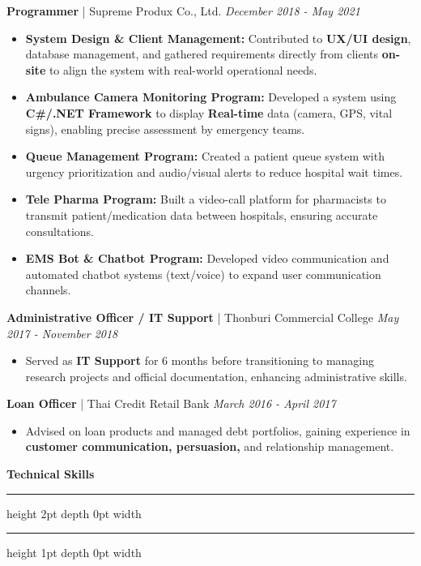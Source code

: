 \documentclass[11pt, a4paper]{article}
\newcommand{\sectiontitle}[1]{
    \vspace{1em}
    {\Large\bfseries\sffamily\color{primaryblue} #1} 
    \vspace{0.3em}
    \hrule height 2pt depth 0pt width \textwidth \color{linecolor}
    \hrule height 1pt depth 0pt width \textwidth
    \vspace{0.7em}
}
\newcommand{\jobentry}[3]{
    \vspace{0.7em} %
    \textbf{\color{black}#1} | #2 \hfill \emph{#3}
}
\begin{document}
\jobentry{Programmer}{Supreme Produx Co., Ltd.}{December 2018 - May 2021}
\begin{itemize}
    \item \textbf{System Design \& Client Management:} Contributed to \textbf{UX/UI design}, database management, and gathered requirements directly from clients \textbf{on-site} to align the system with real-world operational needs.
    \item \textbf{Ambulance Camera Monitoring Program:} Developed a system using \textbf{C\#/.NET Framework} to display \textbf{Real-time} data (camera, GPS, vital signs), enabling precise assessment by emergency teams.
    \item \textbf{Queue Management Program:} Created a patient queue system with urgency prioritization and audio/visual alerts to reduce hospital wait times.
    \item \textbf{Tele Pharma Program:} Built a video-call platform for pharmacists to transmit patient/medication data between hospitals, ensuring accurate consultations.
    \item \textbf{EMS Bot \& Chatbot Program:} Developed video communication and automated chatbot systems (text/voice) to expand user communication channels.
\end{itemize}
\vspace{0.5em}

\jobentry{Administrative Officer / IT Support}{Thonburi Commercial College}{May 2017 - November 2018}
\begin{itemize}
    \item Served as \textbf{IT Support} for 6 months before transitioning to managing research projects and official documentation, enhancing administrative skills.
\end{itemize}
\vspace{0.5em}

\jobentry{Loan Officer}{Thai Credit Retail Bank}{March 2016 - April 2017}
\begin{itemize}
    \item Advised on loan products and managed debt portfolios, gaining experience in \textbf{customer communication, persuasion,} and relationship management.
\end{itemize}
\vspace{0.5em}

\sectiontitle{Technical Skills}
\color{black}
\end{document}
